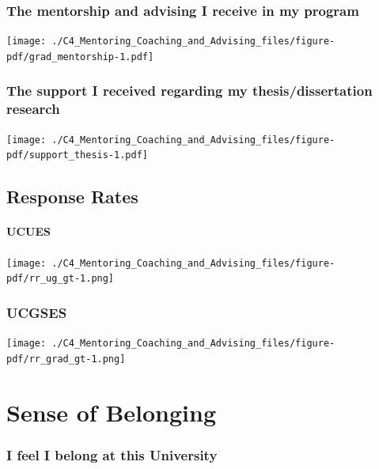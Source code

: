 \documentclass[
  letterpaper,
  DIV=11,
  numbers=noendperiod]{scrreprt}
\begin{document}
\hypertarget{the-mentorship-and-advising-i-receive-in-my-program}{%
\subsection{The mentorship and advising I receive in my
program}\label{the-mentorship-and-advising-i-receive-in-my-program}}

\texttt{[image: ./C4\_Mentoring\_Coaching\_and\_Advising\_files/figure-pdf/grad\_mentorship-1.pdf]}

\hypertarget{the-support-i-received-regarding-my-thesisdissertation-research}{%
\subsection{The support I received regarding my thesis/dissertation
research}\label{the-support-i-received-regarding-my-thesisdissertation-research}}

\texttt{[image: ./C4\_Mentoring\_Coaching\_and\_Advising\_files/figure-pdf/support\_thesis-1.pdf]}

\hypertarget{response-rates-1}{%
\section{Response Rates}\label{response-rates-1}}

\hypertarget{ucues-1}{%
\subsubsection{UCUES}\label{ucues-1}}

\texttt{[image: ./C4\_Mentoring\_Coaching\_and\_Advising\_files/figure-pdf/rr\_ug\_gt-1.png]}

\hypertarget{ucgses-1}{%
\subsection{UCGSES}\label{ucgses-1}}

\texttt{[image: ./C4\_Mentoring\_Coaching\_and\_Advising\_files/figure-pdf/rr\_grad\_gt-1.png]}


\hypertarget{sense-of-belonging}{%
\chapter{Sense of Belonging}\label{sense-of-belonging}}

\hypertarget{i-feel-i-belong-at-this-university}{%
\subsection{I feel I belong at this
University}\label{i-feel-i-belong-at-this-university}}
\end{document}

